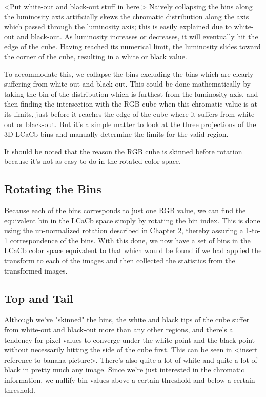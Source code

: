 <Put white-out and black-out stuff in here.>
Naively collapsing the bins along the luminosity axis artificially skews the chromatic distribution along the axis which passed through the luminosity axis; this is easily explained due to white-out and black-out. As luminosity increases or decreases, it will eventually hit the edge of the cube. Having reached its numerical limit, the luminosity slides toward the corner of the cube, resulting in a white or black value.

To accommodate this, we collapse the bins excluding the bins which are clearly suffering from white-out and black-out. This could be done mathematically by taking the bin of the distribution which is furthest from the luminosity axis, and then finding the intersection with the RGB cube when this chromatic value is at its limits, just before it reaches the edge of the cube where it suffers from white-out or black-out. But it's a simple matter to look at the three projections of the 3D LCaCb bins and manually determine the limits for the valid region.

It should be noted that the reason the RGB cube is skinned before rotation because it's not as easy to do in the rotated color space.


\subsection{Rotating the Bins}\label{sec:RotatingTheBins}
Because each of the bins corresponds to just one RGB value, we can find the equivalent bin in the LCaCb space simply by rotating the bin index. This is done using the un-normalized rotation described in Chapter 2, thereby assuring a 1-to-1 correspondence of the bins. With this done, we now have a set of bins in the LCaCb color space equivalent to that which would be found if we had applied the transform to each of the images and then collected the statistics from the transformed images.


\subsection{Top and Tail}\label{sec:TopAndTail}
Although we've "skinned" the bins, the white and black tips of the cube suffer from white-out and black-out more than any other regions, and there's a tendency for pixel values to converge under the white point and the black point without necessarily hitting the side of the cube first. This can be seen in <insert reference to banana picture>. There's also quite a lot of white and quite a lot of black in pretty much any image. Since we're just interested in the chromatic information, we nullify bin values above a certain threshold and below a certain threshold.


